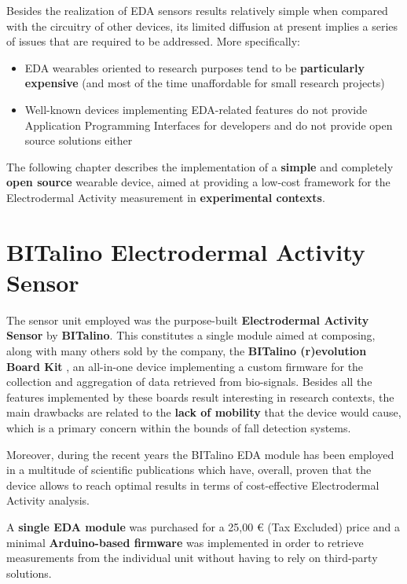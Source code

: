 \label{ch:implementation}

Besides the realization of EDA sensors results relatively simple when compared with the circuitry of other devices, its limited diffusion at present implies a series of issues that are required to be addressed. More specifically:

\begin{itemize}
    \item EDA wearables oriented to research purposes tend to be \textbf{particularly expensive} (and most of the time unaffordable for small research projects)
    \item Well-known devices implementing EDA-related features do not provide Application Programming Interfaces for developers and do not provide open source solutions either
\end{itemize}

The following chapter describes the implementation of a \textbf{simple} and completely \textbf{open source} wearable device, aimed at providing a low-cost framework for the Electrodermal Activity measurement in \textbf{experimental contexts}.

\section{BITalino Electrodermal Activity Sensor}\label{sec:bitalino}

The sensor unit employed was the purpose-built \textbf{Electrodermal Activity Sensor} by \textbf{BITalino}. This constitutes a single module aimed at composing, along with many others sold by the company, the \textbf{BITalino (r)evolution Board Kit} \cite{bitalino-general}, an all-in-one device implementing a custom firmware for the collection and aggregation of data retrieved from bio-signals. Besides all the features implemented by these boards result interesting in research contexts, the main drawbacks are related to the \textbf{lack of mobility} that the device would cause, which is a primary concern within the bounds of fall detection systems.

Moreover, during the recent years the BITalino EDA module has been employed in a multitude of scientific publications which have, overall, proven that the device allows to reach optimal results in terms of cost-effective Electrodermal Activity analysis.

A \textbf{single EDA module} was purchased for a 25,00 € (Tax Excluded) price and a minimal \textbf{Arduino-based firmware} was implemented in order to retrieve measurements from the individual unit without having to rely on third-party solutions.

